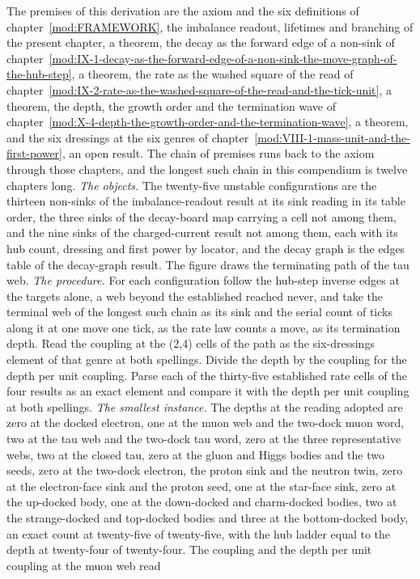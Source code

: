 \begin{chproof}
The premises of this derivation are the axiom and the six definitions of chapter~\ref{mod:FRAMEWORK}, the imbalance readout, lifetimes and branching of the present chapter, a theorem, the decay as the forward edge of a non-sink of chapter~\ref{mod:IX-1-decay-as-the-forward-edge-of-a-non-sink-the-move-graph-of-the-hub-step}, a theorem, the rate as the washed square of the read of chapter~\ref{mod:IX-2-rate-as-the-washed-square-of-the-read-and-the-tick-unit}, a theorem, the depth, the growth order and the termination wave of chapter~\ref{mod:X-4-depth-the-growth-order-and-the-termination-wave}, a theorem, and the six dressings at the six genres of chapter~\ref{mod:VIII-1-mass-unit-and-the-first-power}, an open result. The chain of premises runs back to the axiom through those chapters, and the longest such chain in this compendium is twelve chapters long.
\textit{The objects.} The twenty-five unstable configurations are the thirteen non-sinks of the imbalance-readout result at its sink reading in its table order, the three sinks of the decay-board map carrying a cell not among them, and the nine sinks of the charged-current result not among them, each with its hub count, dressing and first power by locator, and the decay graph is the edges table of the decay-graph result. The figure draws the terminating path of the tau web.
\textit{The procedure.} For each configuration follow the hub-step inverse edges at the targets alone, a web beyond the established reached never, and take the terminal web of the longest such chain as its sink and the serial count of ticks along it at one move one tick, as the rate law counts a move, as its termination depth. Read the coupling at the (2,4) cells of the path as the six-dressings element of that genre at both spellings. Divide the depth by the coupling for the depth per unit coupling. Parse each of the thirty-five established rate cells of the four results as an exact element and compare it with the depth per unit coupling at both spellings.
\textit{The smallest instance.} The depths at the reading adopted are zero at the docked electron, one at the muon web and the two-dock muon word, two at the tau web and the two-dock tau word, zero at the three representative webs, two at the closed tau, zero at the gluon and Higgs bodies and the two seeds, zero at the two-dock electron, the proton sink and the neutron twin, zero at the electron-face sink and the proton seed, one at the star-face sink, zero at the up-docked body, one at the down-docked and charm-docked bodies, two at the strange-docked and top-docked bodies and three at the bottom-docked body, an exact count at twenty-five of twenty-five, with the hub ladder equal to the depth at twenty-four of twenty-four. The coupling and the depth per unit coupling at the muon web read

\end{chproof}
